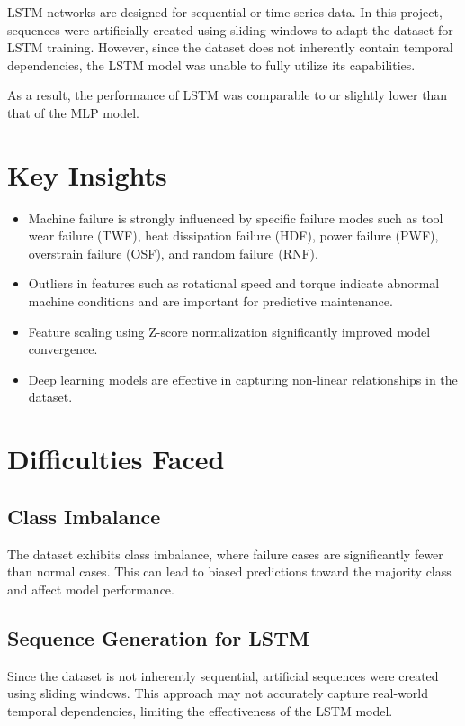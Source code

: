 \documentclass{ecsproject}     %
\begin{document}
LSTM networks are designed for sequential or time-series data. In this project, sequences were artificially created using sliding windows to adapt the dataset for LSTM training. However, since the dataset does not inherently contain temporal dependencies, the LSTM model was unable to fully utilize its capabilities.

As a result, the performance of LSTM was comparable to or slightly lower than that of the MLP model.

\section{Key Insights}

\begin{itemize}
    \item Machine failure is strongly influenced by specific failure modes such as tool wear failure (TWF), heat dissipation failure (HDF), power failure (PWF), overstrain failure (OSF), and random failure (RNF).
    \item Outliers in features such as rotational speed and torque indicate abnormal machine conditions and are important for predictive maintenance.
    \item Feature scaling using Z-score normalization significantly improved model convergence.
    \item Deep learning models are effective in capturing non-linear relationships in the dataset.
\end{itemize}

\section{Difficulties Faced}

\subsection{Class Imbalance}

The dataset exhibits class imbalance, where failure cases are significantly fewer than normal cases. This can lead to biased predictions toward the majority class and affect model performance.

\subsection{Sequence Generation for LSTM}

Since the dataset is not inherently sequential, artificial sequences were created using sliding windows. This approach may not accurately capture real-world temporal dependencies, limiting the effectiveness of the LSTM model.
\end{document}
